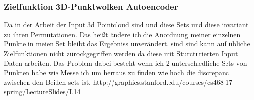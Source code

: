 \documentclass{llncs}
\begin{document}
\subsubsection{Zielfunktion 3D-Punktwolken Autoencoder}

Da in der Arbeit der Input 3d Pointcloud sind und diese Sets und diese invariant zu ihren Permutationen. Das heißt ändere ich die Anordnung meiner einzelnen Punkte in meien Set bleibt das Ergebniss unverändert.  sind sind kann auf übliche Zielfunktionen nicht zürockgegriffen werden da diese mit Sturcturierten Input Daten arbeiten. Das Problem dabei besteht wenn ich 2 unterschiedliche Sets von Punkten habe wie Messe ich um herraus zu finden wie hoch die discrepanc zwischen den Beiden sets ist. 
http://graphics.stanford.edu/courses/cs468-17-spring/LectureSlides/L14%
\end{document}
